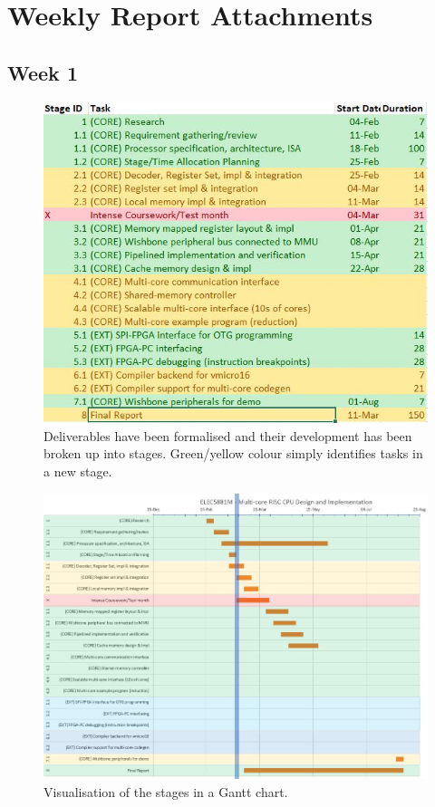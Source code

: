 \documentclass[11pt,a4paper]{article}
\begin{document}
\newpage
\section{Weekly Report Attachments}
\subsection{Week 1}
\label{sect:week1}
\begin{figure}[H]
    \centering
    \includegraphics[scale=0.8]{week1_tasks}
    \caption{Deliverables have been formalised and their development has been broken up into stages. Green/yellow colour simply identifies tasks in a new stage.}
    \label{fig:h5_impl}
\end{figure}

\begin{figure}[H]
    \centering
    \includegraphics[scale=0.8]{week1_gantt}
    \caption{Visualisation of the stages in a Gantt chart.}
    \label{fig:h5_impl}
\end{figure}
\end{document}
